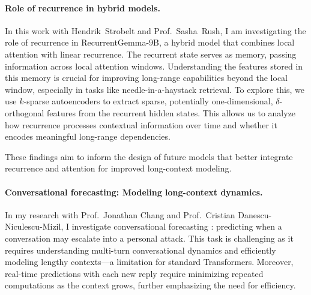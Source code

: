 
\paragraph{Role of recurrence in hybrid models.}

In this work with Hendrik~Strobelt and Prof.~Sasha~Rush, I am investigating the role of recurrence in RecurrentGemma-$9$B, a hybrid model that combines local attention with linear recurrence.
%
The recurrent state serves as memory, passing information across local attention windows.
%
Understanding the features stored in this memory is crucial for improving long-range capabilities beyond the local window, especially in tasks like needle-in-a-haystack retrieval.
%
To explore this, we use $k$-sparse autoencoders to extract sparse, potentially one-dimensional, $\delta$-orthogonal features from the recurrent hidden states.
%
This allows us to analyze how recurrence processes contextual information over time and whether it encodes meaningful long-range dependencies.

These findings aim to inform the design of future models that better integrate recurrence and attention for improved long-context modeling.



\paragraph{Conversational forecasting: Modeling long-context dynamics.}

In my research with Prof.~Jonathan Chang and Prof.~Cristian Danescu-Niculescu-Mizil, I investigate conversational forecasting \citep{chang_trouble_2019}: predicting when a conversation may escalate into a personal attack.
%
This task is challenging as it requires understanding multi-turn conversational dynamics and efficiently modeling lengthy contexts---a limitation for standard Transformers.
%
Moreover, real-time predictions with each new reply require minimizing repeated computations as the context grows, further emphasizing the need for efficiency.

